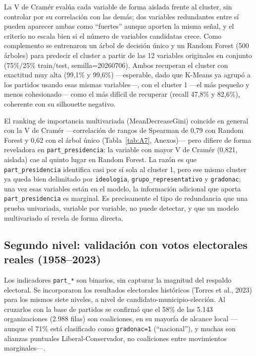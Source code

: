\documentclass[11pt,letterpaper]{article}
\newcommand{\code}[1]{\texttt{\small #1}}
\begin{document}
La V de Cramér evalúa cada variable de forma aislada frente al cluster, sin controlar por su correlación con las demás; dos variables redundantes entre sí pueden aparecer ambas como ``fuertes'' aunque aporten la misma señal, y el criterio no escala bien si el número de variables candidatas crece. Como complemento se entrenaron un árbol de decisión único y un Random Forest (500 árboles) para predecir el cluster a partir de las 12 variables originales en conjunto (75\%/25\% train/test, semilla=20260706). Ambos recuperan el cluster con exactitud muy alta (99,1\% y 99,6\%) ---esperable, dado que K-Means ya agrupó a los partidos usando esas mismas variables---, con el cluster 1 ---el más pequeño y menos cohesionado--- como el más difícil de recuperar (recall 47,8\% y 82,6\%), coherente con su silhouette negativo.

El ranking de importancia multivariada (MeanDecreaseGini) coincide en general con la V de Cramér ---correlación de rangos de Spearman de 0,79 con Random Forest y 0,62 con el árbol único (Tabla~\ref{tab:A7}, Anexos)--- pero difiere de forma reveladora en \code{part\_presidencia}: la variable con mayor V de Cramér (0,821, aislada) cae al quinto lugar en Random Forest. La razón es que \code{part\_presidencia} identifica casi por sí sola al cluster 1, pero ese mismo cluster ya queda bien delimitado por \code{ideologia}, \code{grupo\_representativo} y \code{gradonac}; una vez esas variables están en el modelo, la información adicional que aporta \code{part\_presidencia} es marginal. Es precisamente el tipo de redundancia que una prueba univariada, variable por variable, no puede detectar, y que un modelo multivariado sí revela de forma directa.

\subsection{Segundo nivel: validación con votos electorales reales (1958--2023)}
\label{sec:nivel2}

Los indicadores \code{part\_*} son binarios, sin capturar la magnitud del respaldo electoral. Se incorporaron los resultados electorales históricos (Torres et al., 2023) para los mismos siete niveles, a nivel de candidato-municipio-elección. Al cruzarlos con la base de partidos se confirmó que el 58\% de las 5.143 organizaciones (2.988 filas) son coaliciones, en su mayoría de alcance local ---aunque el 71\% está clasificado como \code{gradonac=1} (``nacional''), y muchas son alianzas puntuales Liberal-Conservador, no coaliciones entre movimientos marginales---.
\end{document}
